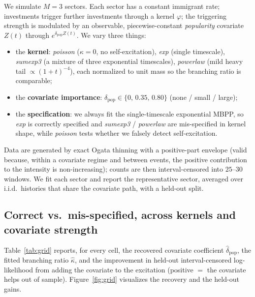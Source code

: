 \documentclass[11pt]{article}
\theoremstyle{plain}
\theoremstyle{definition}
\theoremstyle{remark}
\begin{document}
We simulate $M=3$ sectors. Each sector has a constant immigrant rate; investments
trigger further investments through a kernel $\varphi$; the triggering strength is
modulated by an observable, piecewise-constant \emph{popularity} covariate
$Z(t)$ through $e^{\delta_{\mathrm{pop}}Z(t)}$. We vary three things:
\begin{itemize}[leftmargin=1.4em,itemsep=1pt]
\item the \textbf{kernel}: \emph{poisson} ($\kappa=0$, no self-excitation),
\emph{exp} (single timescale), \emph{sumexp3} (a mixture of three exponential
timescales), \emph{powerlaw} (mild heavy tail $\propto(1+t)^{-4}$), each normalized
to unit mass so the branching ratio is comparable;
\item the \textbf{covariate importance}: $\delta_{\mathrm{pop}}\in\{0,\,0.35,\,0.80\}$
(none / small / large);
\item the \textbf{specification}: we always fit the single-timescale exponential
MBPP, so \emph{exp} is correctly specified and \emph{sumexp3} / \emph{powerlaw} are
mis-specified in kernel shape, while \emph{poisson} tests whether we falsely detect
self-excitation.
\end{itemize}
Data are generated by exact Ogata thinning with a positive-part envelope (valid
because, within a covariate regime and between events, the positive contribution to
the intensity is non-increasing); counts are then interval-censored into $25$--$30$
windows. We fit each sector and report the representative sector, averaged over
i.i.d.\ histories that share the covariate path, with a held-out split.

\subsection{Correct vs.\ mis-specified, across kernels and covariate strength}
\label{sec:grid}

Table~\ref{tab:grid} reports, for every cell, the recovered covariate coefficient
$\hat\delta_{\mathrm{pop}}$, the fitted branching ratio $\hat\kappa$, and the
improvement in held-out interval-censored log-likelihood from adding the covariate
to the excitation (positive $=$ the covariate helps out of sample).
Figure~\ref{fig:grid} visualizes the recovery and the held-out gains.
\end{document}

